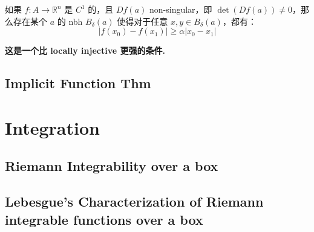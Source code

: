 \documentclass[lang=cn,11pt]{elegantbook}
\begin{document}
\begin{lemma}
    如果 $f: A \rightarrow \mathbb{R}^n$ 是 $C^1$ 的，且 $Df(a)$ non-singular，即 $\det(Df(a)) \not = 0$，那么存在某个 $a$ 的 nbh $B_{\delta} (a)$ 使得对于任意 $x,y \in B_{\delta}(a)$，都有：
    $$
    |f(x_0) - f(x_1)| \geq \alpha |x_0 - x_1|
    $$
\end{lemma}
\begin{note}
 \textbf{这是一个比 locally injective 更强的条件.}
\end{note}







\section{Implicit Function Thm}












\chapter{Integration}
\section{Riemann Integrability over a box}



\section{Lebesgue's Characterization of Riemann integrable functions over a box}
\end{document}

